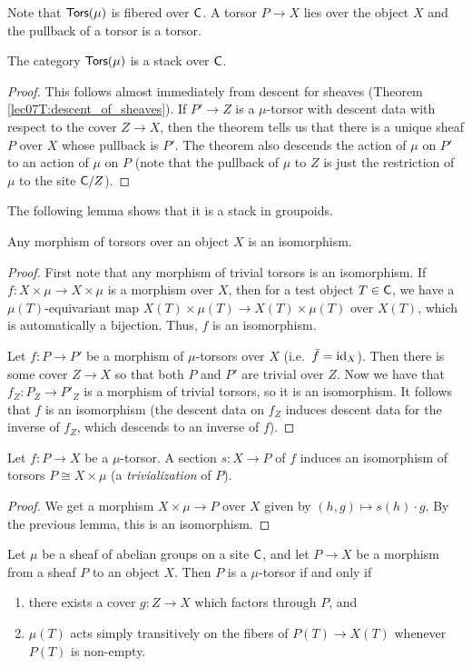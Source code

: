 Note that $\text{\sf Tors}(\mu)$ is fibered over $\text{\sf C}$. A torsor $P\to X$ lies over the object $X$ and the pullback of a torsor is a torsor.
\begin{lemma}
 The category $\text{\sf Tors}(\mu)$ is a stack over $\text{\sf C}$.
\end{lemma}
\begin{proof}
 This follows almost immediately from descent for sheaves (Theorem \ref{lec07T:descent_of_sheaves}). If $P'\to Z$ is a $\mu$-torsor with descent data with respect to the cover $Z\to X$, then the theorem tells us that there is a unique sheaf $P$ over $X$ whose pullback is $P'$. The theorem also descends the action of $\mu$ on $P'$ to an action of $\mu$ on $P$ (note that the pullback of $\mu$ to $Z$ is just the restriction of $\mu$ to the site $\text{\sf C}/Z$). 
\end{proof}
The following lemma shows that it is a stack in groupoids.
\begin{lemma}\label{lec30L:mapTorsors=iso}
 Any morphism of torsors over an object $X$ is an isomorphism.
\end{lemma}
\begin{proof}
 First note that any morphism of trivial torsors is an isomorphism. If $f:X\times \mu\to X\times \mu$ is a morphism over $X$, then for a test object $T\in \text{\sf C}$, we have a $\mu(T)$-equivariant map $X(T)\times \mu(T)\to X(T)\times \mu(T)$ over $X(T)$, which is automatically a bijection. Thus, $f$ is an isomorphism.

 Let $f:P\to P'$ be a morphism of $\mu$-torsors over $X$ (i.e.~$\bar f=\operatorname{id}_X$). Then there is some cover $Z\to X$ so that both $P$ and $P'$ are trivial over $Z$. Now we have that $f_Z:P_Z\to P'_Z$ is a morphism of trivial torsors, so it is an isomorphism. It follows that $f$ is an isomorphism (the descent data on $f_Z$ induces descent data for the inverse of $f_Z$, which descends to an inverse of $f$).
\end{proof}
\begin{corollary}\label{lec30C:section->trivial}
 Let $f:P\to X$ be a $\mu$-torsor. A section $s:X\to P$ of $f$ induces an isomorphism of torsors $P\cong X\times \mu$ (a \emph{trivialization} of $P$).
\end{corollary}
\begin{proof}
  We get a morphism $X\times \mu \to P$ over $X$ given by $(h,g)\mapsto s(h)\cdot g$. By the previous lemma, this is an isomorphism.
\end{proof}
\begin{proposition} \label{lec30P:altdef_torsor}
 Let $\mu$ be a sheaf of abelian groups on a site $\text{\sf C}$, and let $P\to X$ be a morphism from a sheaf $P$ to an object $X$. Then $P$ is a $\mu$-torsor if and only if
 \begin{enumerate}
  \item there exists a cover $g:Z\to X$ which factors through $P$, and
  \item $\mu(T)$ acts simply transitively on the fibers of $P(T)\to X(T)$ whenever $P(T)$ is non-empty.
 \end{enumerate}
\end{proposition}
